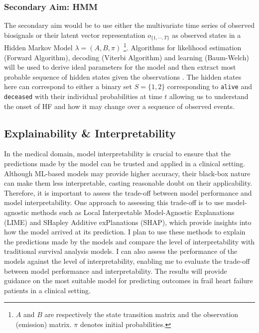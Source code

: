 \documentclass[%
 reprint,
 amsmath,amssymb,
 aps,
 nofootinbib,
]{revtex4-2}
\theoremstyle{definition}
\begin{document}
\subsubsection{\label{sec}Secondary Aim: HMM}
The secondary aim would be to use either the multivariate time series of observed biosignals or their latent vector representation $o_{\{1,\cdots,T\}}$ as observed states in a Hidden Markov Model $\lambda = (A,B,\pi)$ \footnote{$A$ and $B$ are respectively the state transition matrix and the observation (emission) matrix. $\pi$ denotes initial probabilities.}. Algorithms for likelihood estimation (Forward Algorithm), decoding (Viterbi Algorithm) and learning (Baum-Welch) will be used to derive ideal parameters for the model and then extract most probable sequence of hidden states given the observations \citep{keselj2009speech}. The hidden states here can correspond to either a binary set $S = \{1 , 2\}$ corresponding to \texttt{alive} and \texttt{deceased} with their individual probabilities at time $t$ allowing us to understand the onset of HF and how it may change over a sequence of observed events.


\subsection{\label{expla}Explainability \& Interpretability}
In the medical domain, model interpretability is crucial to ensure that the predictions made by the model can be trusted and applied in a clinical setting. Although ML-based models may provide higher accuracy, their black-box nature can make them less interpretable, casting reasonable doubt on their applicability. Therefore, it is important to assess the trade-off between model performance and model interpretability. One approach to assessing this trade-off is to use model-agnostic methods such as Local Interpretable Model-Agnostic Explanations (LIME) and SHapley Additive exPlanations (SHAP), which provide insights into how the model arrived at its prediction. I plan to use these methods to explain the predictions made by the models and compare the level of interpretability with traditional survival analysis models. I can also assess the performance of the models against the level of interpretability, enabling me to evaluate the trade-off between model performance and interpretability. The results will provide guidance on the most suitable model for predicting outcomes in frail heart failure patients in a clinical setting.
\end{document}
